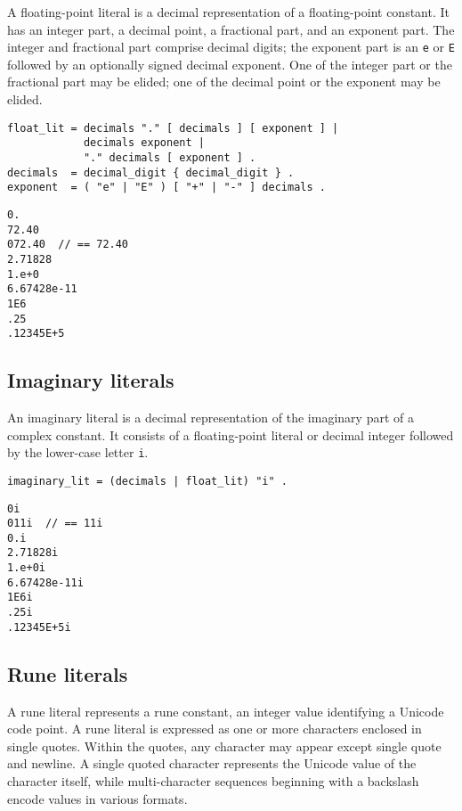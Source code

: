 A floating-point literal is a decimal representation of a
floating-point constant. It has an integer part, a
decimal point, a fractional part, and an exponent part. The integer and
fractional part comprise decimal digits; the exponent part is an
\texttt{e} or \texttt{E} followed by an optionally signed decimal
exponent. One of the integer part or the fractional part may be elided;
one of the decimal point or the exponent may be elided.

\begin{Verbatim}[frame=single]
float_lit = decimals "." [ decimals ] [ exponent ] |
            decimals exponent |
            "." decimals [ exponent ] .
decimals  = decimal_digit { decimal_digit } .
exponent  = ( "e" | "E" ) [ "+" | "-" ] decimals .
\end{Verbatim}

\begin{Verbatim}[frame=single]
0.
72.40
072.40  // == 72.40
2.71828
1.e+0
6.67428e-11
1E6
.25
.12345E+5
\end{Verbatim}

\subsection*{Imaginary literals}

An imaginary literal is a decimal representation of the imaginary part
of a complex constant. It consists of a
floating-point literal or decimal
integer followed by the lower-case letter \texttt{i}.

\begin{Verbatim}[frame=single]
imaginary_lit = (decimals | float_lit) "i" .
\end{Verbatim}

\begin{Verbatim}[frame=single]
0i
011i  // == 11i
0.i
2.71828i
1.e+0i
6.67428e-11i
1E6i
.25i
.12345E+5i
\end{Verbatim}

\subsection*{Rune literals}

A rune literal represents a rune constant, an
integer value identifying a Unicode code point. A rune literal is
expressed as one or more characters enclosed in single quotes. Within
the quotes, any character may appear except single quote and newline. A
single quoted character represents the Unicode value of the character
itself, while multi-character sequences beginning with a backslash
encode values in various formats.

